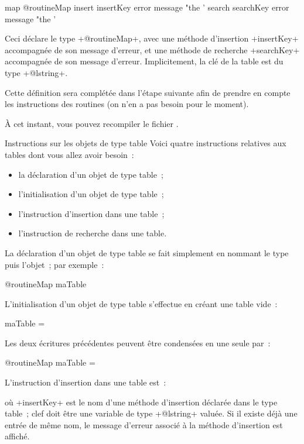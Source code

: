 \begin{galgas3}
map @routineMap {
  insert insertKey error message "the '%
  search searchKey error message "the '%
}
\end{galgas3}

Ceci déclare le type \ggst+@routineMap+, avec une méthode d'insertion \ggst+insertKey+ accompagnée de son message d'erreur, et une méthode de recherche \ggst+searchKey+ accompagnée de son message d'erreur. Implicitement, la clé de la table est du type \ggst+@lstring+.

Cette définition sera complétée dans l'étape suivante afin de prendre en compte les instructions des routines (on n'en a pas besoin pour le moment).

À cet instant, vous pouvez recompiler le fichier .

Instructions sur les objets de type table
Voici quatre instructions relatives aux tables dont vous allez avoir besoin~:
\begin{itemize}
  \item la déclaration d'un objet de type table~;
  \item l'initialisation d'un objet de type table~;
  \item l'instruction d'insertion dans une table~;
  \item l'instruction de recherche dans une table.
\end{itemize}

La déclaration d'un objet de type table se fait simplement en nommant le type puis l'objet~; par exemple~:
\begin{galgas3}
@routineMap maTable
\end{galgas3}

L'initialisation d'un objet de type table s'effectue en créant une table vide~:
\begin{galgas3}
maTable = {}
\end{galgas3}

Les deux écritures précédentes peuvent être condensées en une seule par~:
\begin{galgas3}
@routineMap maTable = {}
\end{galgas3}

L'instruction d'insertion dans une table est~:
\begin{galgas3}
\end{galgas3}
où \ggst+insertKey+ est le nom d'une méthode d'insertion déclarée dans le type table~; clef doit être une variable de type \ggst+@lstring+ valuée. Si il existe déjà une entrée de même nom, le message d'erreur associé à la méthode d'insertion est affiché.


